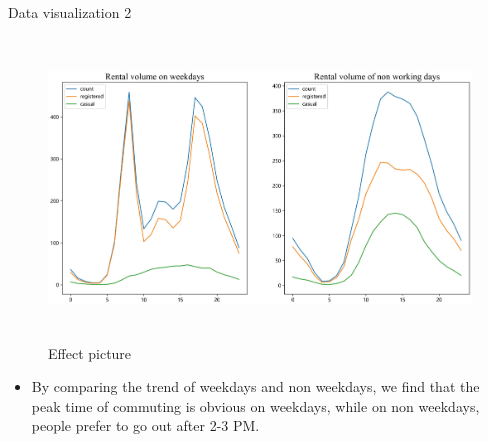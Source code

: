 \documentclass[
  size=14pt,
  paper=smartboard,  %
  mode=present, 		%
  display=slides, 	%
  style=tuliplab,  	%
  pauseslide,
  fleqn,leqno]{powerdot}
\newcommand\twotonebox[2]{\fcolorbox{pdcolor2}{pdcolor2}
 {#1\vphantom{#2}}\fcolorbox{pdcolor2}{white}{#2\vphantom{#1}}}
\begin{document}
        \begin{slide}{Data visualization 2}
          
          \begin{figure}[htb]
            \centering
            \includegraphics[width=18cm,height=8cm,trim=45 45 45 45,clip]{figures//work-time.eps}
            \vspace{-1.6em}
            \caption{Effect picture}
          \end{figure}
          \vspace{-1.6em}
          \begin{itemize}
            \item
            By comparing the trend of weekdays and non weekdays, we find that the peak time of commuting is obvious on weekdays, while on non weekdays, people prefer to go out after 2-3 PM.
            \end{itemize}
         
        \end{slide}
   



\end{document}
